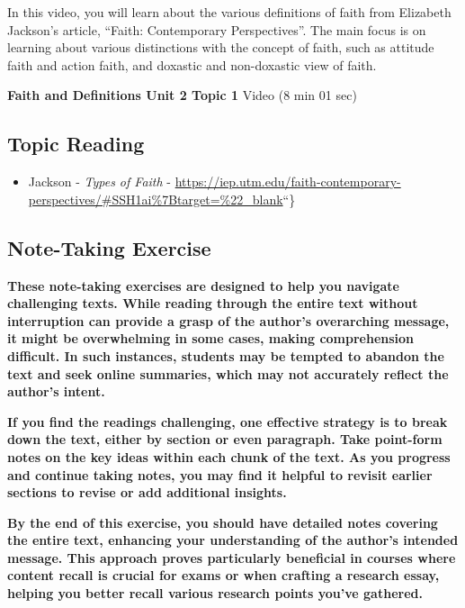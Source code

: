 \documentclass[
]{book}
\providecommand{\tightlist}{%
  \setlength{\itemsep}{0pt}\setlength{\parskip}{0pt}}
\begin{document}
In this video, you will learn about the various definitions of faith from Elizabeth Jackson's article, ``Faith: Contemporary Perspectives''. The main focus is on learning about various distinctions with the concept of faith, such as attitude faith and action faith, and doxastic and non-doxastic view of faith.

\textbf{Faith and Definitions Unit 2 Topic 1} Video (8 min 01 sec)

\hypertarget{topic-reading-4}{%
\subsection*{Topic Reading}\label{topic-reading-4}}

\begin{itemize}
\tightlist
\item
  Jackson - \emph{Types of Faith} - \url{https://iep.utm.edu/faith-contemporary-perspectives/\#SSH1ai\%7Btarget=\%22_blank}``\}
\end{itemize}

\hypertarget{note-taking-exercise-4}{%
\subsection*{Note-Taking Exercise}\label{note-taking-exercise-4}}

\textbf{These note-taking exercises are designed to help you navigate challenging texts. While reading through the entire text without interruption can provide a grasp of the author's overarching message, it might be overwhelming in some cases, making comprehension difficult. In such instances, students may be tempted to abandon the text and seek online summaries, which may not accurately reflect the author's intent.}

\textbf{If you find the readings challenging, one effective strategy is to break down the text, either by section or even paragraph. Take point-form notes on the key ideas within each chunk of the text. As you progress and continue taking notes, you may find it helpful to revisit earlier sections to revise or add additional insights.}

\textbf{By the end of this exercise, you should have detailed notes covering the entire text, enhancing your understanding of the author's intended message. This approach proves particularly beneficial in courses where content recall is crucial for exams or when crafting a research essay, helping you better recall various research points you've gathered.}
\end{document}
